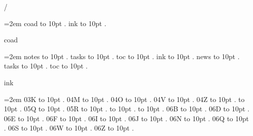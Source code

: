 
\parindent=0pt
\pdfpagewidth=148mm
\pdfpageheight=210mm
\hsize=128mm
\vsize=190mm
\pdfhorigin=0pt
\pdfvorigin=0pt
\hoffset=10mm
\voffset=10mm
/
\par\begingroup
\leftskip=2em
\smallskip
coad \leaders\hbox to 10pt {\hss.\hss}  \hfill {}
\smallskip
ink \leaders\hbox to 10pt {\hss.\hss}  \hfill {}
\smallskip
\medskip
\par\endgroup
\bigskip
{}
coad
\par\begingroup
\leftskip=2em
\smallskip
notes \leaders\hbox to 10pt {\hss.\hss}  \hfill {}
\smallskip
tasks \leaders\hbox to 10pt {\hss.\hss}  \hfill {}
\smallskip
toc \leaders\hbox to 10pt {\hss.\hss}  \hfill {}
\smallskip
\medskip
ink \leaders\hbox to 10pt {\hss.\hss}  \hfill {}
\smallskip
news \leaders\hbox to 10pt {\hss.\hss}  \hfill {}
\smallskip
tasks \leaders\hbox to 10pt {\hss.\hss}  \hfill {}
\smallskip
toc \leaders\hbox to 10pt {\hss.\hss}  \hfill {}
\smallskip
\par\endgroup
\bigskip
{}
ink
\par\begingroup
\leftskip=2em
\smallskip
\medskip
03K \leaders\hbox to 10pt {\hss.\hss}  \hfill {}
\smallskip
04M \leaders\hbox to 10pt {\hss.\hss}  \hfill {}
\smallskip
04O \leaders\hbox to 10pt {\hss.\hss}  \hfill {}
\smallskip
04V \leaders\hbox to 10pt {\hss.\hss}  \hfill {}
\smallskip
04Z \leaders\hbox to 10pt {\hss.\hss}  \hfill {}
 \leaders\hbox to 10pt {\hss.\hss}  \hfill {}
\smallskip
05Q \leaders\hbox to 10pt {\hss.\hss}  \hfill {}
\smallskip
05R \leaders\hbox to 10pt {\hss.\hss}  \hfill {}
 \leaders\hbox to 10pt {\hss.\hss}  \hfill {}
 \leaders\hbox to 10pt {\hss.\hss}  \hfill {}
\smallskip
06B \leaders\hbox to 10pt {\hss.\hss}  \hfill {}
\smallskip
06D \leaders\hbox to 10pt {\hss.\hss}  \hfill {}
\smallskip
06E \leaders\hbox to 10pt {\hss.\hss}  \hfill {}
\smallskip
06F \leaders\hbox to 10pt {\hss.\hss}  \hfill {}
\smallskip
06I \leaders\hbox to 10pt {\hss.\hss}  \hfill {}
\smallskip
06J \leaders\hbox to 10pt {\hss.\hss}  \hfill {}
\smallskip
06N \leaders\hbox to 10pt {\hss.\hss}  \hfill {}
\smallskip
06Q \leaders\hbox to 10pt {\hss.\hss}  \hfill {}
\smallskip
06S \leaders\hbox to 10pt {\hss.\hss}  \hfill {}
\smallskip
06W \leaders\hbox to 10pt {\hss.\hss}  \hfill {}
\smallskip
06Z \leaders\hbox to 10pt {\hss.\hss}  \hfill {}
